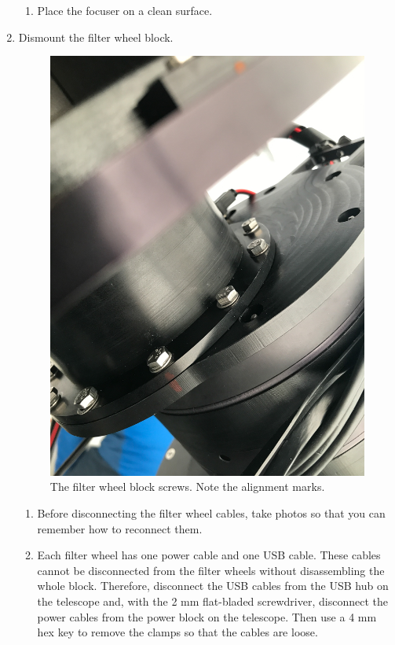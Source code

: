 \begin{enumerate}
\begin{enumerate}
  \item Place the focuser on a clean surface.
  
\end{enumerate}

\item Dismount the filter wheel block.

\begin{figure}
\begin{center}
\includegraphics[angle=0,width=0.8\linewidth]{figures/huitzi-f20-filter-wheel-block-screws}
\end{center}
\caption{The filter wheel block screws. Note the alignment marks.}
\label{figure:huitzi-f20-filter-wheel-block-screws}
\end{figure}
   
\begin{enumerate}
    
    \item Before disconnecting the filter wheel cables, take photos so that you can remember how to reconnect them.    

   \item Each filter wheel has one power cable and one USB cable. These cables cannot be disconnected from the filter wheels without disassembling the whole block. Therefore, disconnect the USB cables from the USB hub on the telescope and, with the 2 mm flat-bladed screwdriver, disconnect the power cables from the power block on the telescope. Then use a 4 mm hex key to remove the clamps so that the cables are loose.
   

\end{enumerate}
\end{enumerate}
